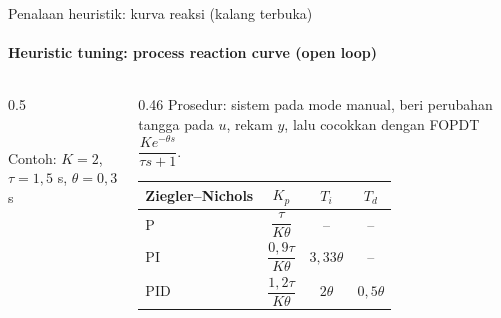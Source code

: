 \documentclass[aspectratio=169,10pt]{beamer}
\begin{document}
\begin{frame}{Penalaan heuristik: kurva reaksi (kalang terbuka)}
	\framesubtitle{Heuristic tuning: process reaction curve (open loop)}
	\begin{columns}[c]
		\begin{column}{0.5\textwidth}
			\centering
			\\
			{\scriptsize Contoh: $K=2$, $\tau=1{,}5$ s, $\theta=0{,}3$ s}
		\end{column}
		\begin{column}{0.46\textwidth}
			\small
			Prosedur: sistem pada mode manual, beri perubahan tangga pada $u$, rekam $y$, lalu cocokkan dengan FOPDT $\dfrac{K e^{-\theta s}}{\tau s+1}$.

			\vspace{0.2cm}
			\scriptsize
			\renewcommand{\arraystretch}{2.2}
			\begin{tabular}{@{}l c c c@{}}
				\toprule
				\textbf{Ziegler--Nichols} & $K_p$ & $T_i$ & $T_d$ \\
				\midrule
				P & $\dfrac{\tau}{K\theta}$ & -- & -- \\
				PI & $\dfrac{0{,}9\tau}{K\theta}$ & $3{,}33\theta$ & -- \\
				PID & $\dfrac{1{,}2\tau}{K\theta}$ & $2\theta$ & $0{,}5\theta$ \\
				\bottomrule
			\end{tabular}
		\end{column}
	\end{columns}
\end{frame}
\end{document}
